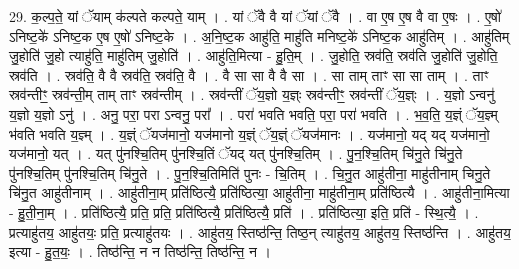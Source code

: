 \documentclass[17pt]{extarticle}
\begin{document}
29. क॒ल्प॒ते॒ यां ॅयाम् क॑ल्पते कल्पते॒ याम् । . यां ॅवै वै यां ॅयां ॅवै । . वा ए॒ष ए॒ष वै वा ए॒षः । . ए॒षो॑ ऽनिष्ट॒के॑ ऽनिष्ट॒क ए॒ष ए॒षो॑ ऽनिष्ट॒के । . अ॒नि॒ष्ट॒क आहु॑ति॒ माहु॑ति मनिष्ट॒के॑ ऽनिष्ट॒क आहु॑तिम् । . आहु॑तिम् जु॒होति॑ जु॒हो त्याहु॑ति॒ माहु॑तिम् जु॒होति॑ । . आहु॑ति॒मित्या - हु॒ति॒म् । . जु॒होति॒ स्रव॑ति॒ स्रव॑ति जु॒होति॑ जु॒होति॒ स्रव॑ति । . स्रव॑ति॒ वै वै स्रव॑ति॒ स्रव॑ति॒ वै । . वै सा सा वै वै सा । . सा ताम् ताꣳ सा सा ताम् । . ताꣳ स्रव॑न्तीꣳ॒॒ स्रव॑न्ती॒म् ताम् ताꣳ स्रव॑न्तीम् । . स्रव॑न्तीं ॅय॒ज्ञो य॒ज्ञ्ः स्रव॑न्तीꣳ॒॒ स्रव॑न्तीं ॅय॒ज्ञ्ः । . य॒ज्ञो ऽन्वनु॑ य॒ज्ञो य॒ज्ञो ऽनु॑ । . अनु॒ परा॒ परा ऽन्वनु॒ परा᳚ । . परा॑ भवति भवति॒ परा॒ परा॑ भवति । . भ॒व॒ति॒ य॒ज्ञ्ं ॅय॒ज्ञ्म् भ॑वति भवति य॒ज्ञ्म् । . य॒ज्ञ्ं ॅयज॑मानो॒ यज॑मानो य॒ज्ञ्ं ॅय॒ज्ञ्ं ॅयज॑मानः । . यज॑मानो॒ यद् यद् यज॑मानो॒ यज॑मानो॒ यत् । . यत् पु॑नश्चि॒तिम् पु॑नश्चि॒तिं ॅयद् यत् पु॑नश्चि॒तिम् । . पु॒न॒श्चि॒तिम् चि॑नु॒ते चि॑नु॒ते पु॑नश्चि॒तिम् पु॑नश्चि॒तिम् चि॑नु॒ते । . पु॒न॒श्चि॒तिमिति॑ पुनः - चि॒तिम् । . चि॒नु॒त आहु॑तीना॒ माहु॑तीनाम् चिनु॒ते चि॑नु॒त आहु॑तीनाम् । . आहु॑तीना॒म् प्रति॑ष्ठित्यै॒ प्रति॑ष्ठित्या॒ आहु॑तीना॒ माहु॑तीना॒म् प्रति॑ष्ठित्यै । . आहु॑तीना॒मित्या - हु॒ती॒ना॒म् । . प्रति॑ष्ठित्यै॒ प्रति॒ प्रति॒ प्रति॑ष्ठित्यै॒ प्रति॑ष्ठित्यै॒ प्रति॑ । . प्रति॑ष्ठित्या॒ इति॒ प्रति॑ - स्थि॒त्यै॒ । . प्रत्याहु॑तय॒ आहु॑तयः॒ प्रति॒ प्रत्याहु॑तयः । . आहु॑तय॒ स्तिष्ठ॑न्ति॒ तिष्ठ॒न् त्याहु॑तय॒ आहु॑तय॒ स्तिष्ठ॑न्ति । . आहु॑तय॒ इत्या - हु॒त॒यः॒ । . तिष्ठ॑न्ति॒ न न तिष्ठ॑न्ति॒ तिष्ठ॑न्ति॒ न । \newline
\end{document}
